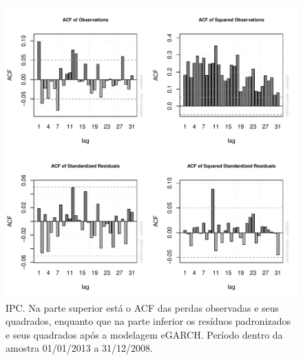 \documentclass[1p]{elsarticle}
\theoremstyle{definition}
\begin{document}
\begin{figure}[H]
	\centering
	\includegraphics[width=1\linewidth]{figs/artigo-acf-IPC}
	\caption{IPC. Na parte superior está o ACF das perdas observadas e seus quadrados, enquanto que na parte inferior os resíduos padronizados e seus quadrados após a modelagem eGARCH. Período dentro da amostra 01/01/2013 a 31/12/2008.}
	\label{fig:artigo-acf-ipc}
\end{figure}
\end{document}

